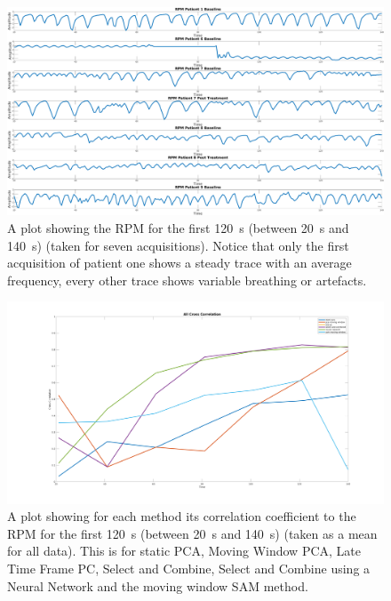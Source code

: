         \begin{figure}
        \centering
        
        \includegraphics[width=1.0\linewidth]{figures/rpm_signals.png}
        
        \captionsetup{singlelinecheck=false, justification=centering}
        \caption{A plot showing the \gls{RPM} for the first \SI{120}{\second} (between \SI{20}{\second} and \SI{140}{\second}) (taken for seven acquisitions). Notice that only the first acquisition of patient one shows a steady trace with an average frequency, every other trace shows variable breathing or artefacts.}
        \label{fig:rpm_signals}
    \end{figure}
    
    \begin{figure}
        \centering
        
        \includegraphics[width=1.0\linewidth]{figures/all_cross_correlation.png}
        
        \captionsetup{singlelinecheck=false, justification=centering}
        \caption{A plot showing for each method its correlation coefficient to the \gls{RPM} for the first \SI{120}{\second} (between \SI{20}{\second} and \SI{140}{\second}) (taken as a mean for all data). This is for static \gls{PCA}, Moving Window \gls{PCA}, Late Time Frame \gls{PC}, Select and Combine, Select and Combine using a Neural Network and the moving window \gls{SAM} method.}
        \label{fig:all_cross_correlation}
    \end{figure}
    
